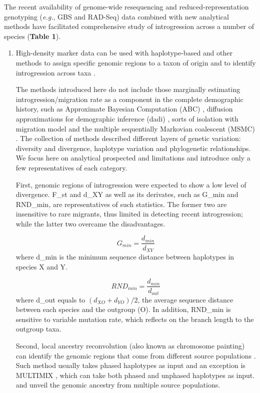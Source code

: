 \documentclass[11pt]{article}
\begin{document}
The recent availability of genome-wide resequencing and reduced-representation genotyping (\emph{e.g.}, GBS and RAD-Seq) data combined with new analytical methods have facilitated comprehensive study of introgression across a number of species (\textbf{Table 1}).
\begin{enumerate}
\item{High-density marker data can be used with haplotype-based and other methods to assign specific genomic regions to a taxon of origin and to identify introgression across taxa \cite{Martin2015,Price2009,Lawson2012,pease2015,rosenzweig2016,geneva2015}.}

The methods introduced here do not include those marginally estimating introgression/migration rate as a component in the complete demographic history, such as Approximate Bayesian Computation (ABC) \cite{beaumont2002}, diffusion approximations for demographic inference (dadi) \cite {gutenkunst2009}, sorts of isolation with migration model \cite{hey2004} and the multiple sequentially Markovian coalescent (MSMC) \cite{schiffels2014}. 
The collection of methods described different layers of genetic variation: diversity and divergence, haplotype variation and phylogenetic relationships.
We focus here on analytical prospected and limitations and introduce only a few representatives of each category.

First, genomic regions of introgression were expected to show a low level of divergence.
 F_{st} and d_{XY} as well as its derivates, such as G_{min} \cite{geneva2015} and RND_{min}\cite{rosenzweig2016}, are representatives of such statistics. 
 The former two are insensitive to rare migrants, thus limited in detecting recent introgression; while the latter two  overcame the disadvantages.
 
 \begin{equation}
    G_{min} = \frac{d_{min}}{d_{XY}}
 \end{equation}
 where d_{min} is the minimum sequence distance between haplotypes in species X and Y.
 
 \begin{equation}
 	RND_{min} = \frac{d_{min}}{d_{out}}
 \end{equation}
where d_{out} equals to $(d_{XO} + d_{YO})/2$, the average sequence distance between each species and the outgroup (O).
In addition, RND_{min} is sensitive to variable mutation rate, which reflects on the branch length to the outgroup taxa. 
 
Second, local ancestry reconvolution (also known as chromosome painting) can identify the genomic regions that come from different source populations \cite{schraiber2015}. 
Such method usually takes phased haplotypes as input and an exception is MULTIMIX \cite{churchhouse2013}, which can take both phased and unphased haplotypes as input. and unveil the genomic ancestry from multiple source populations.



\end{enumerate}
\end{document}
